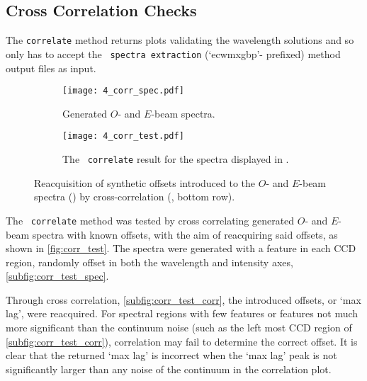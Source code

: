 
\subsection{Cross Correlation Checks} \label{subsec:test_corr}

The \texttt{correlate} method returns plots validating the wavelength solutions and so only has to accept the \polsalt\ \texttt{spectra extraction} (`ecwmxgbp'- prefixed) method output files as input.

\begin{figure}
    \centering
    \begin{subfigure}[b]{\textwidth}
        \centering
        \texttt{[image: 4\_corr\_spec.pdf]}
        \caption{Generated $O$- and $E$-beam spectra.}
        \label{subfig:corr_test_spec}
    \end{subfigure}
    \hfill
    \begin{subfigure}[b]{\textwidth}
        \centering
        \texttt{[image: 4\_corr\_test.pdf]}
        \caption{The \stops\ \texttt{correlate} result for the spectra displayed in .}
        \label{subfig:corr_test_corr}
    \end{subfigure}
    \caption{Reacquisition of synthetic offsets introduced to the $O$- and $E$-beam spectra () by cross-correlation (, bottom row).}
    \label{fig:corr_test}
\end{figure}

The \stops\ \texttt{correlate} method was tested by cross correlating generated $O$- and $E$-beam spectra with known offsets, with the aim of reacquiring said offsets, as shown in \autoref{fig:corr_test}. The spectra were generated with a feature in each \gls{CCD} region, randomly offset in both the wavelength and intensity axes, \autoref{subfig:corr_test_spec}.

Through cross correlation, \autoref{subfig:corr_test_corr}, the introduced offsets, or `max lag', were reacquired. For spectral regions with few features or features not much more significant than the continuum noise (such as the left most \gls{CCD} region of \autoref{subfig:corr_test_corr}), correlation may fail to determine the correct offset. It is clear that the returned `max lag' is incorrect when the `max lag' peak is not significantly larger than any noise of the continuum in the correlation plot.

